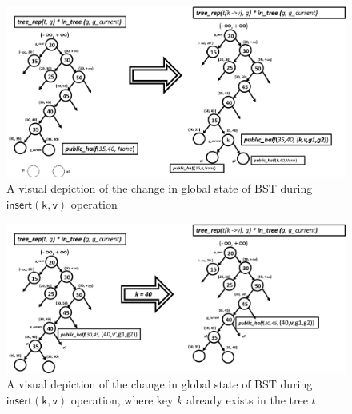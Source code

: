 \documentclass[acmsmall,screen]{acmart}\settopmatter{printfolios=true}
\begin{document}
\begin{figure}[htb]
\centering
\includegraphics[width=150mm,scale=0.5]{FIG/extract_insert.png}
\caption{A visual depiction of the change in global state of BST during $\mathsf{insert(k,v)}$ operation }
\label{extract_insert}
\end{figure}
\begin{figure}[htb]
\centering
\includegraphics[width=150mm,scale=0.5]{FIG/extract_insert_2.png}
\caption{A visual depiction of the change in global state of BST during $\mathsf{insert(k,v)}$ operation, where key $k$ already exists in the tree $t$ }
\label{extract_insert2}
\end{figure}
\end{document}
